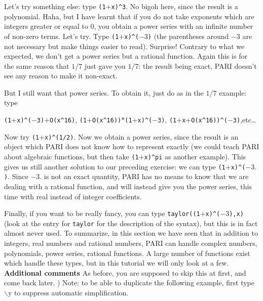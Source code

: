 Let's try something else: type {\tt (1$+$x)\^{}3}. No bigoh here, since the result is a polynomial.
Haha, but I have learnt that if you do not take exponents which are integers greater or equal
to 0, you obtain a power series with an infinite number of non-zero terms. Let's try.
Type {\tt (1$+$x)\^{}($-3$)} (the parentheses around $-3$ are not necessary but make things 
easier to read). Surprise! Contrary to what we expected, we don't get a power series but a
rational function. Again this is for the same reason that $1/7$ just gave you $1/7$: the result
being exact, PARI doesn't see any reason to make it non-exact.

But I still want that power series. To obtain it, just do as in the $1/7$ 
example: type 

{\tt (1$+$x)\^{}($-$3)$+$O(x\^{}{16})}, {\tt (1$+$O(x\^{}{16}))$*$(1$+$x)\^{}($-$3)},
{\tt (1$+$x$+$O(x\^{}{16}))\^{}($-$3)},etc\dots

Now try {\tt (1$+$x)\^{}(1/2)}. Now we obtain a power series, since the result is an object
which PARI does not know how to represent exactly (we could teach PARI about algebraic functions,
but then take {\tt (1$+$x)\^{}pi} as another example). This gives us still another solution to
our preceding exercise: we can type {\tt (1$+$x)\^{}($-3.$)}. Since $-3.$ is not an exact
quantity, PARI has no means to know that we are dealing with a rational function, and
will instead give you the power series, this time with real instead of
integer coefficients.

Finally, if you want to be really fancy, you can type {\tt taylor((1$+$x)\^{}($-3$),x)}
(look at the entry for {\tt taylor} for the description of the syntax), but this is in fact
almost never used.
\smallskip
To summarize, in this section we have seen that in addition to integers,
real numbers and rational numbers, PARI can handle complex numbers,
polynomials, power series, rational functions. A large number of functions 
exist which handle these types, but in this tutorial we will only look at
a few. \medskip
{\bf Additional comments}
\medskip
As before, you are supposed to skip this at first, and come back later.
) Note: to be able to duplicate the following example, first type 
$\backslash$y to suppress automatic simplification.

